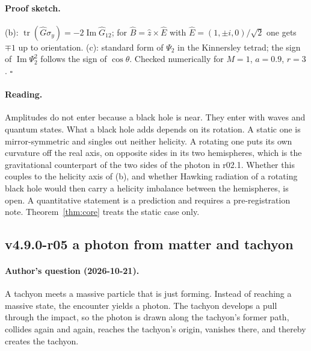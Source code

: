 \paragraph{Proof sketch.}
(b): \(\operatorname{tr}(\hat G\sigma_y)=-2\operatorname{Im}\hat G_{12}\); for \(\hat B=\hat z\times\hat E\) with
\(\hat E=(1,\pm i,0)/\sqrt2\) one gets \(\mp1\) up to orientation.  (c): standard form of \(\Psi_2\) in the Kinnersley tetrad;
the sign of \(\operatorname{Im}\Psi_2^2\) follows the sign of \(\cos\theta\).  Checked numerically for \(M=1\), \(a=0.9\),
\(r=3\).  \(\square\)

\paragraph{Reading.}
Amplitudes do not enter because a black hole is near.  They enter with waves and quantum states.  What a black hole adds
depends on its rotation.  A static one is mirror-symmetric and singles out neither helicity.  A rotating one puts its own
curvature off the real axis, on opposite sides in its two hemispheres, which is the gravitational counterpart of the two
sides of the photon in r02.1.  Whether this couples to the helicity axis of (b), and whether Hawking radiation of a
rotating black hole would then carry a helicity imbalance between the hemispheres, is open.  A quantitative statement is a
prediction and requires a pre-registration note.  Theorem~\ref{thm:core} treats the static case only.

\subsection*{v4.9.0-r05 a photon from matter and tachyon}
\label{subsec:v490-r05-photon}

\paragraph{Author's question (2026-10-21).}
A tachyon meets a massive particle that is just forming.  Instead of reaching a massive state, the encounter yields a
photon.  The tachyon develops a pull through the impact, so the photon is drawn along the tachyon's former path,
collides again and again, reaches the tachyon's origin, vanishes there, and thereby creates the tachyon.

